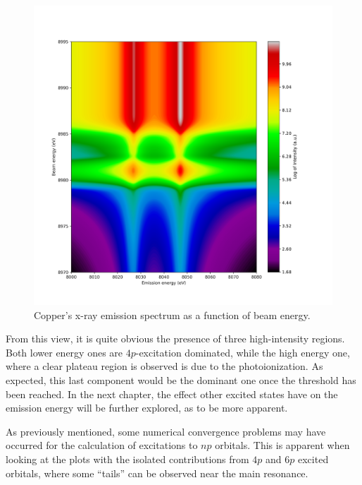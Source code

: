\begin{figure}[h!]
    \centering
    \includegraphics[width=.7\linewidth]{Chapters/Figures/Chapter4/all_log.pdf}
    \caption{Copper's x-ray emission spectrum as a function of beam energy.}\label{fig:all_contrib}
\end{figure}

From this view, it is quite obvious the presence of three high-intensity regions. Both lower energy ones are $4p$-excitation dominated, while the high energy one, where a clear plateau region is observed is due to the photoionization. As expected, this last component would be the dominant one once the threshold has been reached. In the next chapter, the effect other excited states have on the emission energy will be further explored, as to be more apparent.

As previously mentioned, some numerical convergence problems may have occurred for the calculation of excitations to $np$ orbitals. This is apparent when looking at the plots with the isolated contributions from $4p$ and $6p$ excited orbitals, where some ``tails'' can be observed near the main resonance.

